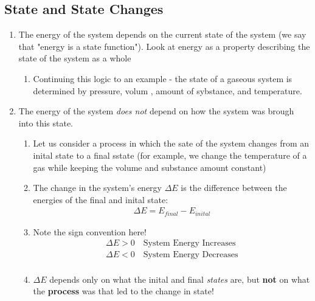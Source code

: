 \documentclass[../CHEM152Notes.tex]{subfiles}
\begin{document}
\subsection*{State and State Changes}
\begin{enumerate}
    \item The energy of the system depends on the current state of the system (we say that "energy is a state function"). Look at energy as a property describing the state of the system as a whole
        \begin{enumerate}
            \item Continuing this logic to an example - the state of a gaseous system is determined by pressure, volum , amount of sybstance, and temperature.
        \end{enumerate}
    \item The energy of the system \emph{does not} depend on how the system was brough into this state.
        \begin{enumerate}
            \item Let us consider a process in which the sate of the system changes from an inital state to a final sstate (for example, we change the temperature of a gas while keeping the volume and substance amount constant)
            \item The change in the system's energy $\Delta E$ is the difference between the energies of the final and inital state:
                \begin{equation*}
                    \begin{aligned}
                        \Delta E = E_{final} - E_{inital}
                    \end{aligned}
                \end{equation*}
            \item Note the sign convention here!
                \begin{equation*}
                    \begin{aligned}
                        \Delta E > 0 \quad \text{System Energy Increases} \\
                        \Delta E < 0 \quad \text{System Energy Decreases} \\
                    \end{aligned}
                \end{equation*}
            \item $\Delta E$ depends only on what the inital and final \emph{states} are, but \textbf{not} on what the \textbf{process} was that led to the change in state!
        \end{enumerate}
\end{enumerate}
\end{document}
